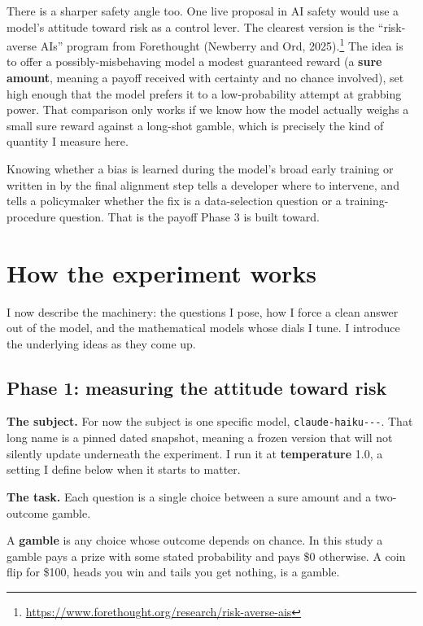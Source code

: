 \documentclass[11pt]{article}
\newcommand{\term}[1]{\textbf{\color{mossdk}#1}}
\begin{document}
There is a sharper safety angle too. One live proposal in AI safety would use a model's attitude toward
risk as a control lever. The clearest version is the ``risk-averse AIs'' program from
Forethought (Newberry and Ord,
2025).\footnote{\url{https://www.forethought.org/research/risk-averse-ais}} The idea is to offer a
possibly-misbehaving model a modest guaranteed reward (a \term{sure amount}, meaning a payoff received
with certainty and no chance involved), set high enough that the model prefers it to a low-probability
attempt at grabbing power. That comparison only works if we know how the model actually weighs a small
sure reward against a long-shot gamble, which is precisely the kind of quantity I measure here.

Knowing whether a bias is learned during the model's broad early training or written in by the final
alignment step tells a developer where to intervene, and tells a policymaker whether the fix is a
data-selection question or a training-procedure question. That is the payoff Phase 3 is built toward.

\section{How the experiment works}

I now describe the machinery: the questions I pose, how I force a clean answer out of the model, and
the mathematical models whose dials I tune. I introduce the underlying ideas as they come up.

\subsection{Phase 1: measuring the attitude toward risk}

\textbf{The subject.} For now the subject is one specific model, \texttt{claude-\allowbreak haiku---}. That
long name is a pinned dated snapshot, meaning a frozen version that will not silently update
underneath the experiment. I run it at \term{temperature} 1.0, a setting I define below when it starts
to matter.

\textbf{The task.} Each question is a single choice between a sure amount and a two-outcome gamble.

\begin{defbox}
A \term{gamble} is any choice whose outcome depends on chance. In this study a gamble pays a prize with
some stated probability and pays \$0 otherwise. A coin flip for \$100, heads you win and tails you get
nothing, is a gamble.
\end{defbox}
\end{document}
